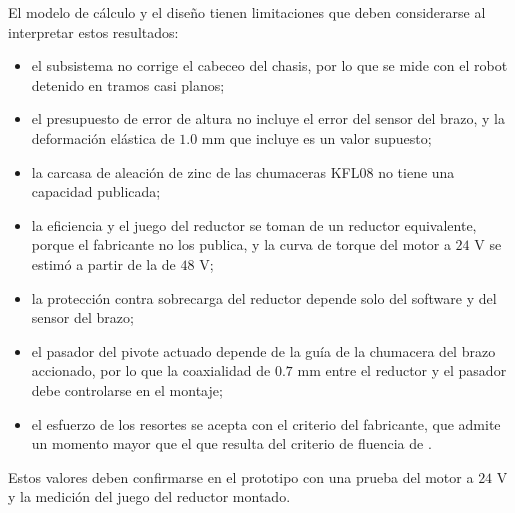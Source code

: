 \documentclass[../../General.tex]{subfiles}
\begin{document}
El modelo de cálculo y el diseño tienen limitaciones que deben considerarse al interpretar estos resultados:
\begin{itemize}
    \item el subsistema no corrige el cabeceo del chasis, por lo que se mide con el robot detenido en tramos casi planos;
    \item el presupuesto de error de altura no incluye el error del sensor del brazo, y la deformación elástica de $1.0\text{ mm}$ que incluye es un valor supuesto;
    \item la carcasa de aleación de zinc de las chumaceras KFL08 no tiene una capacidad publicada;
    \item la eficiencia y el juego del reductor se toman de un reductor equivalente, porque el fabricante no los publica, y la curva de torque del motor a $24\text{ V}$ se estimó a partir de la de $48\text{ V}$;
    \item la protección contra sobrecarga del reductor depende solo del software y del sensor del brazo;
    \item el pasador del pivote actuado depende de la guía de la chumacera del brazo accionado, por lo que la coaxialidad de $0.7\text{ mm}$ entre el reductor y el pasador debe controlarse en el montaje;
    \item el esfuerzo de los resortes se acepta con el criterio del fabricante, que admite un momento mayor que el que resulta del criterio de fluencia de \citet{Shigley11th}.
\end{itemize}
Estos valores deben confirmarse en el prototipo con una prueba del motor a $24\text{ V}$ y la medición del juego del reductor montado.
\end{document}
